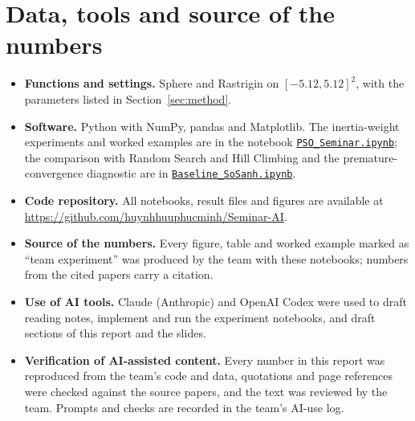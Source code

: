 \documentclass[11pt,a4paper]{article}
\begin{document}
\section*{Data, tools and source of the numbers}
\begin{itemize}
\item \textbf{Functions and settings.} Sphere and Rastrigin on $[-5.12,5.12]^2$, with the parameters listed in Section~\ref{sec:method}.
\item \textbf{Software.} Python with NumPy, pandas and Matplotlib. The inertia-weight experiments and worked examples are in the notebook \href{https://github.com/huynhhuuphucminh/Seminar-AI/blob/main/02_TV2_MoPhong/PSO_Seminar.ipynb}{\texttt{PSO\_Seminar.ipynb}}; the comparison with Random Search and Hill Climbing and the premature-convergence diagnostic are in \href{https://github.com/huynhhuuphucminh/Seminar-AI/blob/main/03_TV3_ThucNghiem/Baseline_SoSanh.ipynb}{\texttt{Baseline\_SoSanh.ipynb}}.
\item \textbf{Code repository.} All notebooks, result files and figures are available at \url{https://github.com/huynhhuuphucminh/Seminar-AI}.
\item \textbf{Source of the numbers.} Every figure, table and worked example marked as ``team experiment'' was produced by the team with these notebooks; numbers from the cited papers carry a citation.
\item \textbf{Use of AI tools.} Claude (Anthropic) and OpenAI Codex were used to draft reading notes, implement and run the experiment notebooks, and draft sections of this report and the slides.
\item \textbf{Verification of AI-assisted content.} Every number in this report was reproduced from the team's code and data, quotations and page references were checked against the source papers, and the text was reviewed by the team. Prompts and checks are recorded in the team's AI-use log.
\end{itemize}
\end{document}
